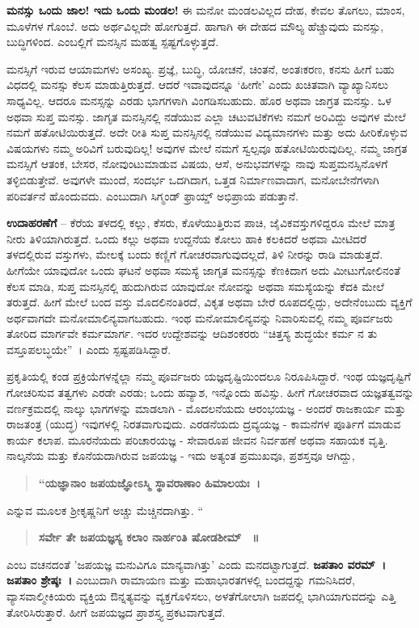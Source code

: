 \textbf{ಮನಸ್ಸು ಒಂದು ಜಾಲ! ಇದು ಒಂದು ಮಂಡಲ!} ಈ ಮನೋ ಮಂಡಲವಿಲ್ಲದ ದೇಹ, ಕೇವಲ ತೊಗಲು, ಮಾಂಸ, ಮೂಳೆಗಳ ಗೊಂಬೆ. ಅದು ಅರ್ಥವಿಲ್ಲದೇ ಹೋಗುತ್ತದೆ. ಹಾಗಾಗಿ ಈ ದೇಹದ ಮೌಲ್ಯ ಹೆಚ್ಚುವುದು ಮನಸ್ಸು, ಬುದ್ಧಿಗಳಿಂದ. ಎಂಬಲ್ಲಿಗೆ ಮನಸ್ಸಿನ ಮಹತ್ವ ಸ್ಪಷ್ಟಗೊಳ್ಳುತ್ತದೆ.

ಮನಸ್ಸಿಗೆ ಇರುವ ಆಯಾಮಗಳು ಅಸಂಖ್ಯ. ಪ್ರಜ್ಞೆ, ಬುದ್ಧಿ, ಯೋಚನೆ, ಚಿಂತನೆ, ಅಂತಃಕರಣ, ಕನಸು ಹೀಗೆ ಬಹು ವಿಧದಲ್ಲಿ ಮನಸ್ಸು ಕೆಲಸ ಮಾಡುತ್ತಿರುತ್ತದೆ. ಆದರೆ ಇವಾವುದನ್ನೂ ‘ಹೀಗೇ’ ಎಂದು ಖಚಿತವಾಗಿ ವ್ಯಾಖ್ಯಾನಿಸಲು ಸಾಧ್ಯವಿಲ್ಲ. ಆದರೂ ಮನಸ್ಸನ್ನು ಎರಡು ಭಾಗಗಳಾಗಿ ವಿಂಗಡಿಸಬಹುದು. ಹೊರ ಅಥವಾ ಜಾಗ್ರತ ಮನಸ್ಸು. ಒಳ ಅಥವಾ ಸುಪ್ತ ಮನಸ್ಸು. ಜಾಗೃತ ಮನಸ್ಸಿನಲ್ಲಿ ನಡೆಯುವ ಎಲ್ಲಾ ಚಟುವಟಿಕೆಗಳು ನಮಗೆ ಅರಿವಿದ್ದು ಅವುಗಳ ಮೇಲೆ ನಮಗೆ ಹತೋಟಿಯಿರುತ್ತದೆ. ಅದೇ ರೀತಿ ಸುಪ್ತ ಮನಸ್ಸಿನಲ್ಲಿ ನಡೆಯುವ ವಿದ್ಯಮಾನಗಳು ಮತ್ತು ಅದು ಹೀರಿಕೊಳ್ಳುವ ವಿಷಯಗಳು ನಮ್ಮ ಅರಿವಿಗೆ ಬರುವುದಿಲ್ಲ! ಅವುಗಳ ಮೇಲೆ ನಮಗೆ ಸ್ವಲ್ಪವೂ ಹತೋಟಿಯಿರುವುದಿಲ್ಲ. ನಮ್ಮ ಜಾಗ್ರತ ಮನಸ್ಸಿಗೆ ಆತಂಕ, ಬೇಸರ, ನೋವುಂಟುಮಾಡುವ ವಿಷಯ, ಆಸೆ, ಅನುಭವಗಳನ್ನು ನಾವು ಸುಪ್ತಮನಸ್ಸಿನೊಳಗೆ ತಳ್ಳಿಬಿಡುತ್ತೇವೆ. ಅವುಗಳೇ ಮುಂದೆ, ಸಂದರ್ಭ ಒದಗಿದಾಗ, ಒತ್ತಡ ನಿರ್ಮಾಣವಾದಾಗ, ಮನೋಬೇನೆಗಳಾಗಿ ಪರಿವರ್ತನೆ ಹೊಂದುವದು. ಎಂಬುದಾಗಿ ಸಿಗ್ಮಂಡ್‌ ಫ್ರಾಯ್ಡ್ ಅಭಿಪ್ರಾಯ ಪಡುತ್ತಾನೆ.

\textbf{ಉದಾಹರಣೆಗೆ} – ಕೆರೆಯ ತಳದಲ್ಲಿ ಕಲ್ಲು, ಕೆಸರು, ಕೊಳೆಯುತ್ತಿರುವ ಪಾಚಿ, ಜೈವಿಕವಸ್ತುಗಳಿದ್ದರೂ ಮೇಲೆ ಮಾತ್ರ ನೀರು ತಿಳಿಯಾಗಿರುತ್ತದೆ. ಒಂದು ಕಲ್ಲು ಅಥವಾ ಉದ್ದನೆಯ ಕೋಲು ಹಾಕಿ ಕಲಕಿದರೆ ಅಥವಾ ಮೀಟಿದರೆ ತಳದಲ್ಲಿರುವ ವಸ್ತುಗಳು, ಮೇಲಕ್ಕೆ ಬಂದು ಕಣ್ಣಿಗೆ ಗೋಚರವಾಗುವುದಲ್ಲದೆ, ತಿಳಿ ನೀರನ್ನು ರಾಡಿ ಮಾಡುತ್ತದೆ. ಹೀಗೆಯೇ ಯಾವುದೋ ಒಂದು ಘಟನೆ ಅಥವಾ ಸಮಸ್ಯೆ ಜಾಗೃತ ಮನಸ್ಸನ್ನು ಕೆಣಕಿದಾಗ ಅದು ಮೀಟುಗೋಲಿನಂತೆ ಕೆಲಸ ಮಾಡಿ, ಸುಪ್ತ ಮನಸ್ಸಿನಲ್ಲಿ ಹುದುಗಿರುವ ಯಾವುದೋ ನೋವನ್ನು ಅಥವಾ ಸಮಸ್ಯೆಯನ್ನು ಕೆದಕಿ ಮೇಲೆ ತರುತ್ತದೆ. ಹೀಗೆ ಮೇಲೆ ಬಂದ ವಸ್ತು ಮೊದಲಿನಂತಿರದೆ, ವಿಕೃತ ಅಥವಾ ಬೇರೆ ರೂಪದಲ್ಲಿದ್ದು, ಅದೇನೆಂಬುದು ವ್ಯಕ್ತಿಗೆ ಅರ್ಥವಾಗದೇ ಮನೋಮಾಲಿನ್ಯವಾಗಬಹುದು. ಇಂಥ ಮನೋಮಾಲಿನ್ಯವನ್ನು ನಿವಾರಿಸುವಲ್ಲಿ ನಮ್ಮ ಪೂರ್ವಜರು ತೋರಿದ ಮಾರ್ಗವೇ ಕರ್ಮಮಾರ್ಗ. ಇದರ ಉದ್ದೇಶವನ್ನು ಆದಿಶಂಕರರು “ಚಿತ್ತಸ್ಯ ಶುದ್ಧಯೇ ಕರ್ಮ ನ ತು ವಸ್ತೂಪಲಬ್ಧಯೇ”~। ಎಂದು ಸ್ಪಷ್ಟಪಡಿಸಿದ್ದಾರೆ.

ಪ್ರಕೃತಿಯಲ್ಲಿ ಕಂಡ ಪ್ರಕ್ರಿಯೆಗಳನ್ನೆಲ್ಲಾ ನಮ್ಮ ಪೂರ್ವಜರು ಯಜ್ಞದೃಷ್ಟಿಯಿಂದಲೂ ನಿರೂಪಿಸಿದ್ದಾರೆ. ಇಂಥ ಯಜ್ಞದೃಷ್ಟಿಗೆ ಗೋಚರಿಸುವ ತತ್ವಗಳು ಎರಡೇ ಎರಡು; ಒಂದು ಹವ್ಯಾಶ, ಇನ್ನೊಂದು ಹವಿಸ್ಸು. ಹೀಗೆ ಗೋಚರವಾದ ಯಜ್ಞತತ್ವವನ್ನು ವರ್ಣಕ್ರಮದಲ್ಲಿ ನಾಲ್ಕು ಭಾಗಗಳನ್ನು ಮಾಡಲಾಗಿ - ಮೊದಲನೆಯದು ಆರಂಭಯಜ್ಞ - ಅಂದರೆ ರಾಜಕಾರ್ಯ ಮತ್ತು ರಾಜತಂತ್ರ (ಯುದ್ಧ) ಇವುಗಳಲ್ಲಿ ನಿರತವಾಗುವುದು. ಎರಡನೆಯದು ದ್ರವ್ಯಯಜ್ಞ - ಕಾಮನೆಗಳ ಪೂರ್ತಿಗೆ ಮಾಡುವ ಕಾರ್ಯ ಕಲಾಪ. ಮೂರನೆಯದು ಪರಿಚಾರಯಜ್ಞ - ಸೇವಾರೂಪ ಜೀವನ ನಿರ್ವಹಣೆ ಅಥವಾ ಸಹಾಯಕ ವೃತ್ತಿ. ನಾಲ್ಕನೆಯ ಮತ್ತು ಕೊನೆಯದಾಗಿರುವ ಜಪಯಜ್ಞ - ಇದು ಅತ್ಯಂತ ಪ್ರಮುಖವೂ, ಪ್ರಶಸ್ತವೂ ಆಗಿದ್ದು, 
\begin{verse}
\textbf{“ಯಜ್ಞಾನಾಂ ಜಪಯಜ್ಞೋಽಸ್ಮಿ ಸ್ಥಾವರಾಣಾಂ ಹಿಮಾಲಯಃ~। }
\end{verse}
ಎನ್ನುವ ಮೂಲಕ ಶ್ರೀಕೃಷ್ಣನಿಗೆ ಅಚ್ಚು ಮೆಚ್ಚಿನದಾಗಿತ್ತು. “ 
\begin{verse}
\textbf{ಸರ್ವೇ ತೇ ಜಪಯಜ್ಞಸ್ಯ ಕಲಾಂ ನಾರ್ಹಂತಿ ಷೋಡಶೀಮ್ ~॥}
\end{verse}
ಎಂಬ ವಚನದಂತೆ ’ಜಪಯಜ್ಞ ಮನುವಿಗೂ ಮಾನ್ಯವಾಗಿತ್ತು’ ಎಂದು ಮನದಟ್ಟಾಗುತ್ತದೆ. \textbf{ಜಪತಾಂ ವರಮ್~। ಜಪತಾಂ ಶ್ರೇಷ್ಠಃ~। } ಎಂಬುದಾಗಿ ರಾಮಾಯಣ ಮತ್ತು ಮಹಾಭಾರತಗಳಲ್ಲಿ ಬಂದದ್ದನ್ನು ಗಮನಿಸಿದರೆ, ವ್ಯಾಸವಾಲ್ಮೀಕಿಯರು ವ್ಯಕ್ತಿಯ ಔನ್ನತ್ಯವನ್ನು ವ್ಯಕ್ತಗೊಳಿಸಲು, ಅಳತೆಗೋಲಾಗಿ ಜಪದಲ್ಲಿ ಭಾಗಿಯಾಗುವದನ್ನು ಎತ್ತಿ ತೋರಿಸಿರುತ್ತಾರೆ. ಹೀಗೆ ಜಪಯಜ್ಞದ ಪ್ರಾಶಸ್ತ್ಯ ಪ್ರಕಟವಾಗುತ್ತದೆ.

